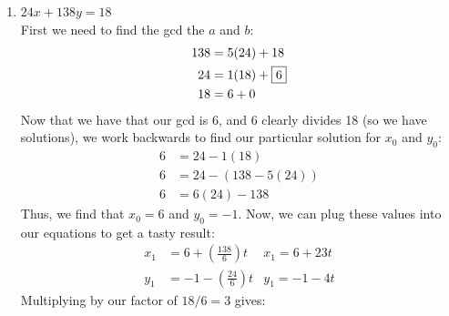 \documentclass[10pt,oneside]{book}
\newcommand{\gspc}{\vspace{0.13cm}} %
\newcommand{\gline}{\gspc\\} %
\begin{document}
\begin{enumerate}
\begin{enumerate}
		First, let's find the gcd of both numbers:
		\begin{align*}
			72 &= 1(56) + 16\\
			56 &= 3(16) + \fbox 8\\
			16 &= 2(8) + 0
		\end{align*}
		Now that we've identified our gcd as 8 (and that $8\mid 40$), we start looking for our $x_0$ and $y_0$ by doing the Euclidean backwards:
		\begin{align*}
			8&= 56 - 3(16)\\
			8&= 56 - 3(72 - 56)\\
			8&= 4(56) - 3(72)
		\end{align*}
		Thus, we have that $x_0 = 4$ and $y_0 = -3$. 
		\begin{align*}
			x_1 &= 4 + \left(\frac{72}8\right)t &x_1 = 4+9t\\
			y_1&= -3 + \left(\frac{56}8\right)t &y_1 = -3 - 7t
		\end{align*}
		However, these are not our final equations, as they are the solution for $c = 8$. Now, we need to multiply the non-coefficients by $40/8 = 5$ to get our final equations:
		\begin{align*}
			x_1 &= 20+9t\\
			y_1 &= -15 - 7t
		\end{align*}
		\item $24x + 138y = 18$\gline
		First we need to find the gcd the $a$ and $b$:
		\begin{align*}
			138 &= 5(24) + 18\\
			24 &= 1(18) + \fbox 6\\
			18 &= 6 + 0
		\end{align*}
		Now that we have that our gcd is 6, and $6$ clearly divides 18 (so we have solutions), we work backwards to find our particular solution for $x_0$ and $y_0$:
		\begin{align*}
			6&= 24 - 1(18)\\
			6&= 24 - (138 - 5(24))\\
			6&= 6(24) - 138
		\end{align*}
		Thus, we find that $x_0 = 6$ and $y_0 = -1$. Now, we can plug these values into our equations to get a tasty result:
		\begin{align*}
			x_1 &= 6 + \left(\frac{138}6\right)t &x_1 = 6+23t\\
			y_1&= -1 - \left(\frac{24}6\right)t &y_1 = -1 - 4t
		\end{align*}
		Multiplying by our factor of $18/6 = 3$ gives:
		\begin{align*}

\end{align*}
\end{enumerate}
\end{enumerate}
\end{document}
